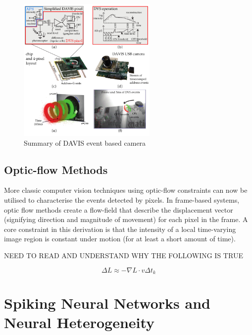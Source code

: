 \begin{figure}[htb]
      \centering
      \includegraphics[width=0.6\textwidth]{background/images/davis_camera.png}
      \caption{Summary of DAVIS event based camera\cite{EventBasedVisionASurvery}}
      \label{fig:davis_camera}
\end{figure}

\subsection{Optic-flow Methods}

More classic computer vision techniques using optic-flow constraints can now be utilised to characterise the events detected by pixels. In frame-based systems, optic flow methods create a flow-field that describe the displacement vector (signifying direction and magnitude of movement) for each pixel in the frame. A core constraint in this derivation is that the intensity of a local time-varying image region is constant under motion (for at least a short amount of time)\cite{GenerativeEventModel}.

\color{red} NEED TO READ AND UNDERSTAND WHY THE FOLLOWING IS TRUE \cite{GenerativeEventModel} \cite{EventBasedVisionASurvery} \color{black}

$$ \Delta L \approx -\nabla L \cdot v \Delta t_k $$

\section{Spiking Neural Networks and Neural Heterogeneity}

